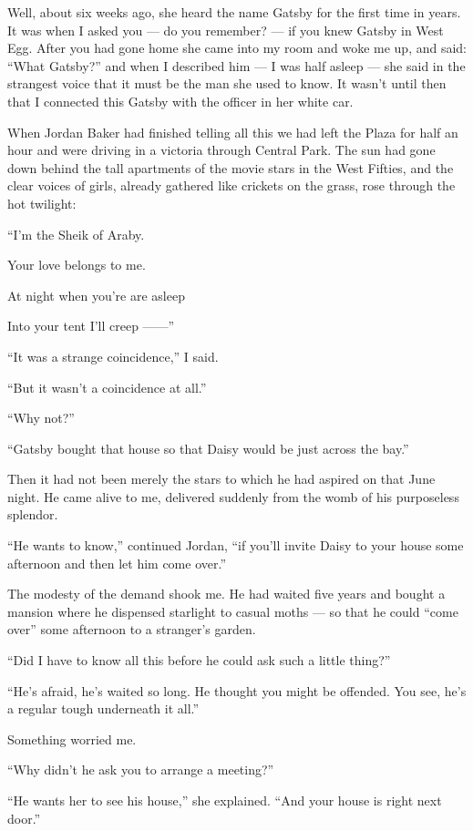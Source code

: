 \documentclass{znotebook}
\begin{document}
Well, about six weeks ago, she heard the name Gatsby for the first time in years. It was when I asked you — do you remember? — if you knew Gatsby in West Egg. After you had gone home she came into my room and woke me up, and said: ``What Gatsby?'' and when I described him — I was half asleep — she said in the strangest voice that it must be the man she used to know. It wasn’t until then that I connected this Gatsby with the officer in her white car.

When Jordan Baker had finished telling all this we had left the Plaza for half an hour and were driving in a victoria through Central Park. The sun had gone down behind the tall apartments of the movie stars in the West Fifties, and the clear voices of girls, already gathered like crickets on the grass, rose through the hot twilight:

``I’m the Sheik of Araby.

Your love belongs to me.

At night when you’re are asleep

Into your tent I’ll creep ——''

``It was a strange coincidence,'' I said.

``But it wasn’t a coincidence at all.''

``Why not?''

``Gatsby bought that house so that Daisy would be just across the bay.''

Then it had not been merely the stars to which he had aspired on that June night. He came alive to me, delivered suddenly from the womb of his purposeless splendor.

``He wants to know,'' continued Jordan, ``if you’ll invite Daisy to your house some afternoon and then let him come over.''

The modesty of the demand shook me. He had waited five years and bought a mansion where he dispensed starlight to casual moths — so that he could ``come over'' some afternoon to a stranger’s garden.

``Did I have to know all this before he could ask such a little thing?''

``He’s afraid, he’s waited so long. He thought you might be offended. You see, he’s a regular tough underneath it all.''

Something worried me.

``Why didn’t he ask you to arrange a meeting?''

``He wants her to see his house,'' she explained. ``And your house is right next door.''
\end{document}
